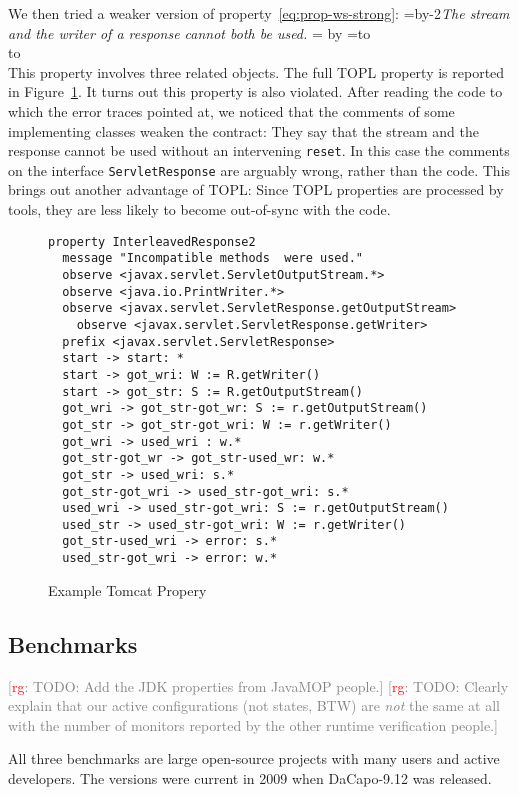 \documentclass[9pt, preprint]{sigplanconf} %
\newcommand{\noterg}[2]{\textcolor{gray}{[\textcolor{red}{#1}: #2]}}
\newcommand{\rg}[1]{\noterg{rg}{#1}}
\newcommand{\quoteindent}{1.5\parindent} %
\newcommand{\eqquote}[2]{{%
  \refstepcounter{equation}\label{#2}%
  \newdimen\qi\qi=\quoteindent
  \setbox0=\vbox{\advance\hsize by-2\qi\noindent\em#1}%
  \newdimen\x\x=\ht0 \advance\x by\dp0%
  \setbox1=\vbox to\x{\vss\hbox{(\arabic{equation})}\vss}%
  \leavevmode\\[1ex]%
  \hbox to\hsize{\hskip\qi\box0\hfil\box1}%
  \\[1ex]}}
\theoremstyle{definition}
\theoremstyle{remark}
\begin{document}
We then tried a weaker version of property~\eqref{eq:prop-ws-strong}:
\eqquote{The stream and the writer of a response cannot both be used.}
{eq:prop-ws-weak}
This property involves three related objects.
The full TOPL property is reported in Figure~\ref{fig:tomcat-prop}.
It turns out this property is also violated.
After reading the code to which the error traces pointed at, we noticed that the comments of some implementing classes weaken the contract:
They say that the stream and the response cannot be used without an intervening {\tt reset}.
In this case the comments on the interface {\tt ServletResponse} are arguably wrong, rather than the code.
This brings out another advantage of TOPL:
Since TOPL properties are processed by tools, they are less likely to become out-of-sync with the code.
\begin{figure}[t]\label{fig:tomcat-prop}
{\small \begin{verbatim}
property InterleavedResponse2
  message "Incompatible methods  were used."
  observe <javax.servlet.ServletOutputStream.*>
  observe <java.io.PrintWriter.*>
  observe <javax.servlet.ServletResponse.getOutputStream>
    observe <javax.servlet.ServletResponse.getWriter>
  prefix <javax.servlet.ServletResponse>
  start -> start: *
  start -> got_wri: W := R.getWriter()
  start -> got_str: S := R.getOutputStream()
  got_wri -> got_str-got_wr: S := r.getOutputStream()
  got_str -> got_str-got_wri: W := r.getWriter()
  got_wri -> used_wri : w.*
  got_str-got_wr -> got_str-used_wr: w.*
  got_str -> used_wri: s.*
  got_str-got_wri -> used_str-got_wri: s.*
  used_wri -> used_str-got_wri: S := r.getOutputStream()
  used_str -> used_str-got_wri: W := r.getWriter()
  got_str-used_wri -> error: s.*
  used_str-got_wri -> error: w.*
\end{verbatim}}
\caption{Example Tomcat Propery}
\end{figure}

\subsection{Benchmarks} %

\rg{TODO: Add the JDK properties from JavaMOP people.}
\rg{TODO: Clearly explain that our active configurations (not states, BTW) are \emph{not} the same at all with the number of monitors reported by the other runtime verification people.}

All three benchmarks are large open-source projects with many users and active developers.
The versions were current in 2009 when DaCapo-9.12 was released.
\end{document}
